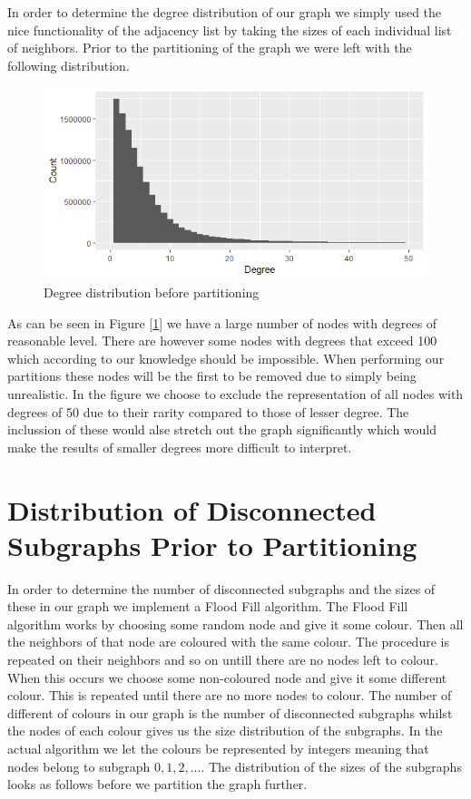 \documentclass[a4paper,10pt]{article}
\newcommand\bref[1]{[\ref{#1}]}
\begin{document}
In order to determine the degree distribution of our graph we simply used the nice functionality of the adjacency list by taking the sizes of each individual list of neighbors. Prior to the partitioning of the graph we were left with the following distribution.
\begin{figure}[H]
	\centering
	\includegraphics[width=0.85\linewidth]{degreesprior.png}
	\caption{Degree distribution before partitioning}
	\label{fig:degprior}
\end{figure}
As can be seen in Figure \bref{fig:degprior} we have a large number of nodes with degrees of reasonable level. There are however some nodes with degrees that exceed 100 which according to our knowledge should be impossible. When performing our partitions these nodes will be the first to be removed due to simply being unrealistic. In the figure we choose to exclude the representation of all nodes with degrees of 50 due to their rarity compared to those of lesser degree. The inclussion of these would alse stretch out the graph significantly which would make the results of smaller degrees more difficult to interpret. 

\section{Distribution of Disconnected Subgraphs Prior to Partitioning}

In order to determine the number of disconnected subgraphs and the sizes of these in our graph we implement a Flood Fill algorithm. The Flood Fill algorithm works by choosing some random node and give it some colour. Then all the neighbors of that node are coloured with the same colour. The procedure is repeated on their neighbors and so on untill there are no nodes left to colour. When this occurs we choose some non-coloured node and give it some different colour. This is repeated until there are no more nodes to colour. The number of different of colours in our graph is the number of disconnected subgraphs whilst the nodes of each colour gives us the size distribution of the subgraphs. In the actual algorithm we let the colours be represented by integers meaning that nodes belong to subgraph $0,1,2,...$. The distribution of the sizes of the subgraphs looks as follows before we partition the graph further.
\end{document}
